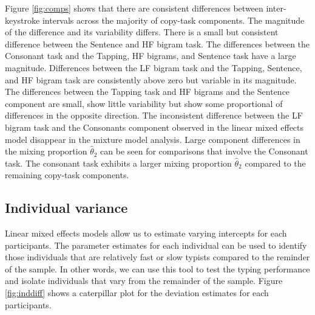 \documentclass[,man,floatsintext]{apa6}
\begin{document}
Figure \ref{fig:comps} shows that there are consistent differences between inter-keystroke intervals across the majority of copy-task components. The magnitude of the difference and its variability differs. There is a small but consistent difference between the Sentence and HF bigram task. The differences between the Consonant task and the Tapping, HF bigrams, and Sentence task have a large magnitude. Differences between the LF bigram task and the Tapping, Sentence, and HF bigram task are consistently above zero but variable in its magnitude. The differences between the Tapping task and HF bigrams and the Sentence component are small, show little variability but show some proportional of differences in the opposite direction. The inconsistent difference between the LF bigram task and the Consonants component observed in the linear mixed effects model disappear in the mixture model analysis. Large component differences in the mixing proportion \(\hat\theta_2\) can be seen for comparisons that involve the Consonant task. The consonant task exhibits a larger mixing proportion \(\hat\theta_2\) compared to the remaining copy-task components.

\hypertarget{individual-variance}{%
\subsection{Individual variance}\label{individual-variance}}

Linear mixed effects models allow us to estimate varying intercepts for each participants. The parameter estimates for each individual can be used to identify those individuals that are relatively fast or slow typists compared to the reminder of the sample. In other words, we can use this tool to test the typing performance and isolate individuals that vary from the remainder of the sample. Figure \ref{fig:inddiff} shows a caterpillar plot for the deviation estimates for each participants.
\end{document}
